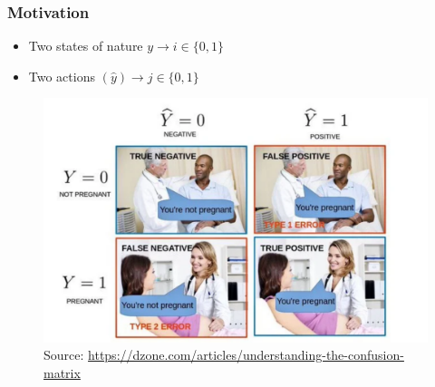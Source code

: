 \documentclass[
  shownotes,
  xcolor={svgnames},
  hyperref={colorlinks,citecolor=DarkBlue,linkcolor=DarkRed,urlcolor=DarkBlue}
  , aspectratio=169]{beamer}
\begin{document}
\begin{frame}[fragile]
\frametitle{Motivation}

\begin{itemize}
  \item Two states of nature $y \rightarrow i\in\{0,1\}$
  \medskip
  \item Two actions $(\hat{y}) \rightarrow j\in \{0,1\}$
\end{itemize}



        \begin{figure}[H] \centering
            \captionsetup{justification=centering}
              \includegraphics[scale=0.4]{figures/confusion_matrix}
              \\
              \tiny
              Source: \url{https://dzone.com/articles/understanding-the-confusion-matrix}
 \end{figure}

\end{frame}
\end{document}
